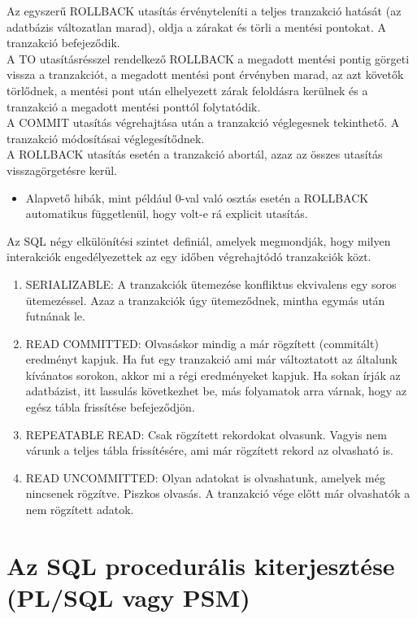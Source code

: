 \documentclass[tikz,12pt,margin=0px]{article}
\begin{document}
    \noindent Az egyszerű ROLLBACK utasítás érvényteleníti a teljes tranzakció hatását (az adatbázis változatlan marad), oldja a zárakat és törli a mentési pontokat. A tranzakció befejeződik.\\

    \noindent A TO utasításrésszel rendelkező ROLLBACK a megadott mentési pontig görgeti vissza a tranzakciót, a megadott mentési pont érvényben marad, az azt követők törlődnek, a mentési pont után elhelyezett zárak feloldásra kerülnek és a tranzakció a megadott mentési ponttól folytatódik.\\

	\noindent A COMMIT utasítás végrehajtása után a tranzakció véglegesnek tekinthető. A tranzakció módosításai véglegesítődnek. \\
    \noindent A ROLLBACK utasítás esetén a tranzakció abortál, azaz az összes utasítás visszagörgetésre kerül.
    \begin{itemize}
        \item Alapvető hibák, mint például 0-val való osztás esetén a ROLLBACK automatikus függetlenül, hogy volt-e rá explicit utasítás.
    \end{itemize}

	\noindent Az SQL négy elkülönítési szintet definiál, amelyek megmondják, hogy milyen interakciók engedélyezettek az egy időben végrehajtódó tranzakciók közt.
	\begin{enumerate}
		\item SERIALIZABLE: A tranzakciók ütemezése konfliktus ekvivalens egy soros ütemezéssel. Azaz a tranzakciók úgy ütemeződnek, mintha egymás után futnának le.
        \item READ COMMITTED: Olvasáskor mindig a már rögzített (commitált) eredményt kapjuk. Ha fut egy tranzakció ami már változtatott az általunk kívánatos sorokon, akkor mi a régi eredményeket kapjuk. Ha sokan írják az adatbázist, itt lassulás következhet be, más folyamatok arra várnak, hogy az egész tábla frissítése befejeződjön.
		\item REPEATABLE READ: Csak rögzített rekordokat olvasunk. Vagyis nem várunk a teljes tábla frissítésére, ami már rögzített rekord az olvasható is.
		\item READ UNCOMMITTED: Olyan adatokat is olvashatunk, amelyek még nincsenek rögzítve. Piszkos olvasás. A tranzakció vége előtt már olvashatók a nem rögzített adatok.
	\end{enumerate}

	\section*{Az SQL procedurális kiterjesztése (PL/SQL vagy PSM)}
	
\end{document}
